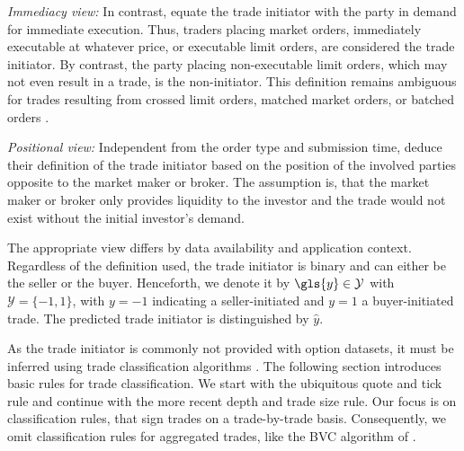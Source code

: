 \emph{Immediacy view:} In contrast, \textcite[][94--97]{leeInferringInvestorBehavior2000} equate the trade initiator with the party in demand for immediate execution. Thus, traders placing market orders, immediately executable at whatever price, or executable limit orders, are considered the trade initiator. By contrast, the party placing non-executable limit orders, which may not even result in a trade, is the non-initiator. This definition remains ambiguous for trades resulting from crossed limit orders, matched market orders, or batched orders \autocite[][94--95]{leeInferringInvestorBehavior2000}.

\emph{Positional view:} Independent from the order type and submission time, \textcite[][533]{ellisAccuracyTradeClassification2000} deduce their definition of the trade initiator based on the position of the involved parties opposite to the market maker or broker. The assumption is, that the market maker or broker only provides liquidity to the investor and the trade would not exist without the initial investor's demand.


The appropriate view differs by data availability and application context.
Regardless of the definition used, the trade initiator is binary and can either be the seller or the buyer. Henceforth, we denote it by $\gls{y} \in \mathcal{Y}$ with $\mathcal{Y}=\{-1,1\}$, with $y=-1$ indicating a seller-initiated and $y=1$ a buyer-initiated trade. The predicted trade initiator is distinguished by $\hat{y}$.


As the trade initiator is commonly not provided with option datasets, it must be inferred using trade classification algorithms \autocite[][453]{easleyOptionVolumeStock1998}. The following section introduces basic rules for trade classification. We start with the ubiquitous quote and tick rule and continue with the more recent depth and trade size rule. Our focus is on classification rules, that sign trades on a trade-by-trade basis. Consequently, we omit classification rules for aggregated trades, like the \gls{BVC} algorithm of \textcite[][1466--1468]{easleyFlowToxicityLiquidity2012}.


